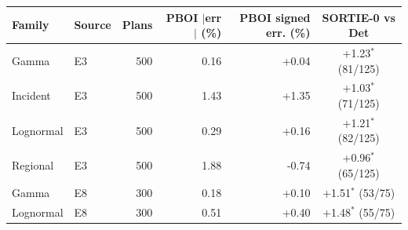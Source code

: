 \begin{tabular}{llrrrc}
\toprule
Family & Source & Plans & PBOI $|$err$|$ (\%) & PBOI signed err. (\%) & SORTIE-0 vs Det \\
\midrule
Gamma & E3 & 500 & 0.16 & +0.04 & +1.23$^\ast$ (81/125) \\
Incident & E3 & 500 & 1.43 & +1.35 & +1.03$^\ast$ (71/125) \\
Lognormal & E3 & 500 & 0.29 & +0.16 & +1.21$^\ast$ (82/125) \\
Regional & E3 & 500 & 1.88 & -0.74 & +0.96$^\ast$ (65/125) \\
Gamma & E8 & 300 & 0.18 & +0.10 & +1.51$^\ast$ (53/75) \\
Lognormal & E8 & 300 & 0.51 & +0.40 & +1.48$^\ast$ (55/75) \\
\bottomrule
\end{tabular}
